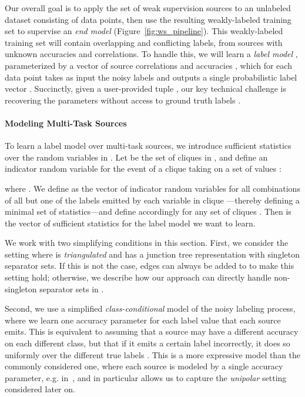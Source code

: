 \documentclass[letterpaper]{article}
\begin{document}
Our overall goal is to apply the set of weak supervision sources  to an unlabeled dataset  consisting of  data points, then use the resulting weakly-labeled training set to supervise an \textit{end model}  (Figure~\ref{fig:ws_pipeline}).
This weakly-labeled training set will contain overlapping and conflicting labels, from sources with unknown accuracies and correlations.
To handle this, we will learn a \textit{label model} , parameterized by a vector of source correlations and accuracies , which for each data point  takes as input the noisy labels  and outputs a single probabilistic label vector .
Succinctly, given a user-provided tuple , our key technical challenge is recovering the parameters  without access to ground truth labels .

\paragraph*{Modeling Multi-Task Sources}
To learn a label model over multi-task sources, we introduce sufficient statistics over the random variables in .
Let  be the set of cliques in , and define an indicator random variable for the event of a clique  taking on a set of values :

where .
We define  as the vector of indicator random variables for all combinations of all but one of the labels emitted by each variable in clique ---thereby defining a minimal set of statistics---and define  accordingly for any set of cliques .
Then  is the vector of sufficient statistics for the label model we want to learn.

We work with two simplifying conditions in this section.
First, we consider the setting where  is \textit{triangulated} and has a junction tree representation with singleton separator sets.
If this is not the case, edges can always be added to  to make this setting hold; otherwise, we describe how our approach can directly handle non-singleton separator sets in .

Second, we use a simplified \textit{class-conditional} model of the noisy labeling process, where we learn one accuracy parameter for each label value  that each source  emits.
This is equivalent to assuming that a source may have a different accuracy on each different class, but that if it emits a certain label incorrectly, it does so uniformly over the different true labels .
This is a more expressive model than the commonly considered one, where each source is modeled by a single accuracy parameter, e.g. in~\cite{dawid1979maximum,ratner2016data}, and in particular allows us to capture the \textit{unipolar} setting considered later on.
\end{document}
